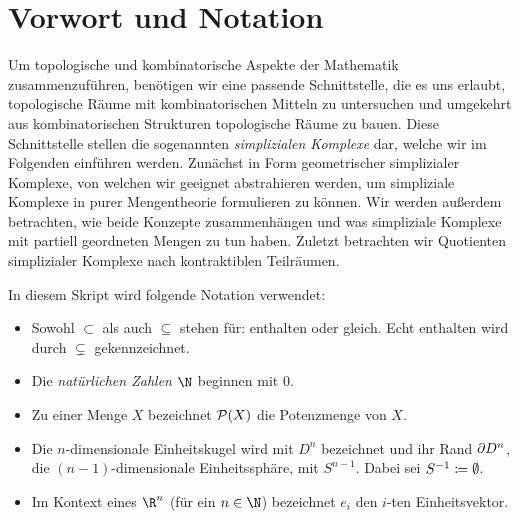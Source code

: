 
\chapter{Vorwort und Notation}
Um topologische und kombinatorische Aspekte der Mathematik zusammenzuführen,
benötigen wir eine passende Schnittstelle, die es uns erlaubt, topologische
Räume mit kombinatorischen Mitteln zu untersuchen und umgekehrt aus
kombinatorischen Strukturen topologische Räume zu bauen. Diese Schnittstelle
stellen die sogenannten \emph{simplizialen Komplexe} dar, welche wir im
Folgenden einführen werden. Zunächst in Form geometrischer simplizialer
Komplexe, von welchen wir geeignet abstrahieren werden, um simpliziale Komplexe
in purer Mengentheorie formulieren zu können. Wir werden außerdem betrachten,
wie beide Konzepte zusammenhängen und was simpliziale Komplexe mit partiell
geordneten Mengen zu tun haben. Zuletzt betrachten wir Quotienten simplizialer
Komplexe nach kontraktiblen Teilräumen.


\bigskip
In diesem Skript wird folgende Notation verwendet:
\begin{itemize}
    \item
        Sowohl $\subset$ als auch $\subseteq$ stehen für: enthalten oder gleich.
        Echt enthalten wird durch $\subsetneq$ gekennzeichnet.
    
    \item
        Die \emph{natürlichen Zahlen $\N$} beginnen mit $0$.
        
    \item
        Zu einer Menge $X$ bezeichnet $\operatorname{\mathcal{P}}(X)$ die Potenzmenge von $X$.

    \item %
        Die $n$-dimensionale Einheitskugel wird mit $D^n$ bezeichnet und
        ihr Rand $\partial D^n$, 
        die $(n{-}1)$-dimensionale Einheitssphäre, mit $S^{n-1}$.
        Dabei sei $S^{-1} \coloneqq \emptyset$.
        
    \item
        Im Kontext eines $\R^n$ (für ein $n\in\N$) bezeichnet $e_i$ den $i$-ten
        Einheitsvektor.
\end{itemize}










